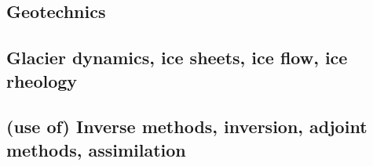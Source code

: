 \subsection{Geotechnics}

{\scriptsize
\noindent
\cite{ster99}
\cite{gora03}
\cite{zhll03}
\cite{gour04}
\cite{gork06}
\cite{bufy14}
}

\subsection{Glacier dynamics, ice sheets, ice flow, ice rheology}

{\scriptsize
\noindent
\cite{wizh94}
\cite{grev97}
\cite{frmm04}
\cite{asbl06}\cite{frmm06}
\cite{susp07}\cite{zwgg07}
\cite{zhjg11}
\cite{pode12}
\cite{lejx14}
\cite{issg15}\cite{frlg15}
\cite{krab16}
\cite{lolc17}
\cite{heah18}
}

\subsection{(use of) Inverse methods, inversion, adjoint methods, assimilation}


